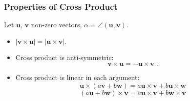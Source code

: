 \begin{frame}
 \frametitle{Properties of Cross Product}
Let $\textbf{u}$, $\textbf{v}$ non-zero vectors, $\alpha = \angle(\textbf{u},\textbf{v})$.


\begin{itemize}
\item<2-> $|\textbf{v} \times \textbf{u}|  = | \textbf{u} \times \textbf{v}|$.


 \item<4-> Cross product is anti-symmetric:
$$\textbf{v} \times \textbf{u} = - \textbf{u} \times \textbf{v} \; .$$
\item<5-> Cross product is linear in each argument:
%
$$ \textbf{u} \times (a\textbf{v} + b\textbf{w}) =
a \textbf{u} \times \textbf{v} + b \textbf{u} \times \textbf{w}$$
%
$$(a\textbf{u} + b\textbf{w}) \times \textbf{v} =
a \textbf{u} \times \textbf{v} + b \textbf{w} \times \textbf{v}$$
\end{itemize}

\end{frame}